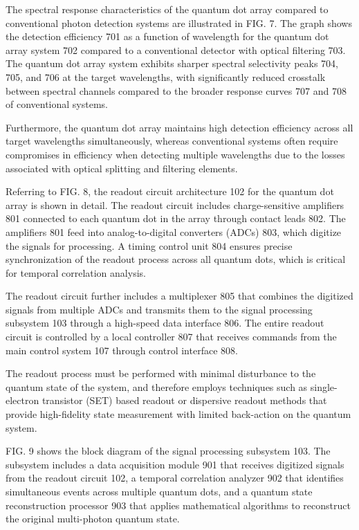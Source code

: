 \documentclass[12pt,letterpaper]{article}
\begin{document}
The spectral response characteristics of the quantum dot array compared to conventional photon detection systems are illustrated in FIG. 7. The graph shows the detection efficiency 701 as a function of wavelength for the quantum dot array system 702 compared to a conventional detector with optical filtering 703. The quantum dot array system exhibits sharper spectral selectivity peaks 704, 705, and 706 at the target wavelengths, with significantly reduced crosstalk between spectral channels compared to the broader response curves 707 and 708 of conventional systems.

Furthermore, the quantum dot array maintains high detection efficiency across all target wavelengths simultaneously, whereas conventional systems often require compromises in efficiency when detecting multiple wavelengths due to the losses associated with optical splitting and filtering elements.

Referring to FIG. 8, the readout circuit architecture 102 for the quantum dot array is shown in detail. The readout circuit includes charge-sensitive amplifiers 801 connected to each quantum dot in the array through contact leads 802. The amplifiers 801 feed into analog-to-digital converters (ADCs) 803, which digitize the signals for processing. A timing control unit 804 ensures precise synchronization of the readout process across all quantum dots, which is critical for temporal correlation analysis.

The readout circuit further includes a multiplexer 805 that combines the digitized signals from multiple ADCs and transmits them to the signal processing subsystem 103 through a high-speed data interface 806. The entire readout circuit is controlled by a local controller 807 that receives commands from the main control system 107 through control interface 808.

The readout process must be performed with minimal disturbance to the quantum state of the system, and therefore employs techniques such as single-electron transistor (SET) based readout or dispersive readout methods that provide high-fidelity state measurement with limited back-action on the quantum system.

FIG. 9 shows the block diagram of the signal processing subsystem 103. The subsystem includes a data acquisition module 901 that receives digitized signals from the readout circuit 102, a temporal correlation analyzer 902 that identifies simultaneous events across multiple quantum dots, and a quantum state reconstruction processor 903 that applies mathematical algorithms to reconstruct the original multi-photon quantum state.
\end{document}
